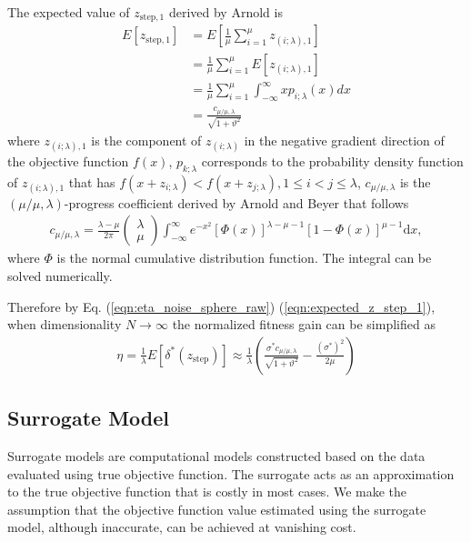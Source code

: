 The expected value of $z_{\text{step},1}$ derived by Arnold \cite{ARNOLD2001127} is
\begin{align}\label{eqn:expected_z_step_1}{}
E \left[ z_{\text{step},1} \right] 
&= E[\frac{1}{\mu}\sum_{i=1}^\mu z_{(i;\lambda),1}] \nonumber\\
&= \frac{1}{\mu} \sum_{i=1}^\mu E [ z_{(i; \lambda),1} ] \nonumber\\
&=  \frac{1}{\mu} \sum_{i=1}^\mu \int_{-\infty}^\infty x p_{i;\lambda}(x)dx \nonumber\\
& = \frac{c_{\mu/\mu,\lambda}}{\sqrt{1+ \vartheta^2}}
\end{align}
where $z_{(i;\lambda),1}$ is the component of $z_{(i;\lambda)}$ in the negative gradient direction of the objective function $f(x)$, $p_{k;\lambda}$ corresponds to the probability density function of $z_{(i;\lambda),1}$ that has $f(x+z_{i;\lambda})<f(x+z_{j;\lambda}), 1 \leq i<j \leq \lambda$, $c_{\mu/\mu,\lambda}$ is the $(\mu/\mu,\lambda)$-progress coefficient derived by Arnold and Beyer \cite{Arnold:2000:EMS:645825.669117} that follows
\begin{align}\label{eqn:c_mu_mu_lambda}
c_{\mu/\mu,\lambda}  = \frac{\lambda-\mu}{2 \pi} \begin{pmatrix} \lambda \\ \mu \end{pmatrix} \int_{-\infty}^{\infty} e^{-x^2}   \left [ \Phi(x)\right]^{\lambda-\mu-1}  \left[ 1- \Phi (x) \right]^{\mu-1}  \text{d} x,
\end{align}
where $\Phi$ is the normal cumulative distribution function. The integral can be solved numerically.  

Therefore by Eq. (\ref{eqn:eta_noise_sphere_raw}) (\ref{eqn:expected_z_step_1}), when dimensionality $N \rightarrow \infty$ the normalized fitness gain can be simplified as
\begin{align}{}\label{eqn:eta_noise_sphere}{}
\eta = \frac{1}{\lambda}E[ \delta^*(z_{\text{step}})] \approx \frac{1}{\lambda} \left( \frac{\sigma^* c_{\mu / \mu, \lambda}}{\sqrt {1+ \vartheta^2}} - \frac{(\sigma^*)^2}{2 \mu} \right)
\end{align}



\subsection{Surrogate Model} \label{ssec:surrogate_model}

Surrogate models are computational models constructed based on the data evaluated using true objective function. The surrogate acts as an approximation to the true objective function that is costly in most cases. We make the assumption that the objective function value estimated using the surrogate model, although inaccurate, can be achieved at vanishing cost. 


